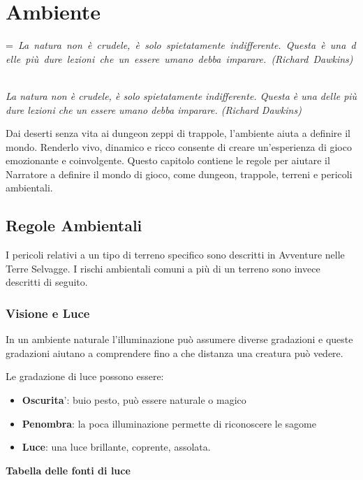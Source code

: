 \documentclass[a4paper,11pt,twoside,openany]{book}
\makeatletter
\newcommand{\mybox}[1]{%
	\setbox0=\hbox{#1}%
	\setlength{\@tempdima}{\dimexpr\wd0+13pt}%
	\begin{tcolorbox}[boxrule=0.5pt,arc=4pt, breakable,enhanced,
		left=6pt,right=6pt,top=6pt,bottom=6pt,boxsep=0pt,width=\@tempdima]
		#1
	\end{tcolorbox}
}
\makeatother
\begin{document}
{\pagebreak

\section{Ambiente}

\label{ambiente}
\mybox{\textit{
La natura non è crudele, è solo spietatamente indifferente. Questa è una delle più dure lezioni che un essere umano debba imparare. (Richard Dawkins)
}}\medskip

Dai deserti senza vita ai dungeon zeppi di trappole, l'ambiente aiuta a definire il mondo. Renderlo vivo, dinamico e ricco consente di creare un'esperienza di gioco emozionante e coinvolgente. Questo capitolo contiene le regole per aiutare il Narratore a definire il mondo di gioco, come dungeon, trappole, terreni e pericoli ambientali.

\subsection{Regole Ambientali}

\label{regole-ambientali}

I pericoli relativi a un tipo di terreno specifico sono descritti in Avventure nelle Terre Selvagge. I rischi ambientali comuni a più di un terreno sono invece descritti di seguito.

\subsubsection{Visione e Luce}

\label{visione-e-luce}

In un ambiente naturale l'illuminazione può assumere diverse gradazioni e queste gradazioni aiutano a comprendere fino a che distanza una creatura può vedere.

Le gradazione di luce possono essere:
\begin{itemize}
\item 
\textbf{Oscurita}': buio pesto, può essere naturale o magico 
\item 
\textbf{Penombra}: la poca illuminazione permette di riconoscere le
sagome 
\item 
\textbf{Luce}: una luce brillante, coprente, assolata. 
\end{itemize}

\medskip

\textbf{Tabella delle fonti di luce}

\medskip

}
\end{document}
